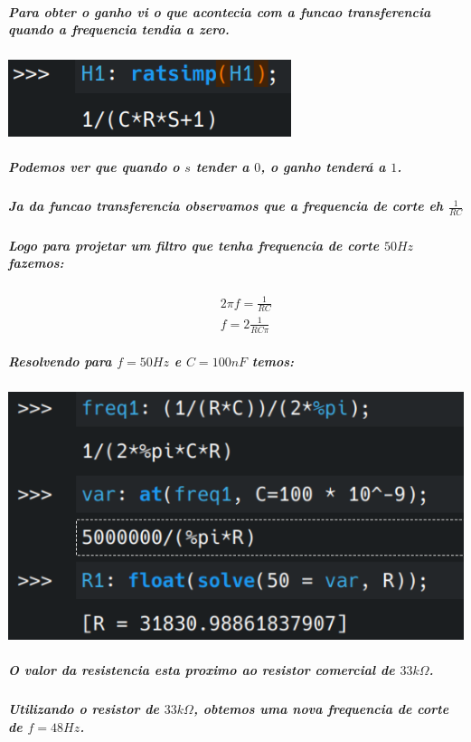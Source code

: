 \documentclass[12pt,twoside, a4paper, twocolumn]{article}
\begin{document}
\subparagraph*{Para obter o ganho vi o que acontecia com a funcao transferencia quando a frequencia tendia a zero.}
\subparagraph*{}
\begin{adjustbox}{scale=0.4}
    \includegraphics{ganho1.png}
\end{adjustbox}
\subparagraph*{Podemos ver que quando o $s$ tender a $0$, o ganho tenderá a $1$.}

\subparagraph*{Ja da funcao transferencia observamos que a frequencia de corte eh $\frac{1}{RC}$}

\subparagraph*{Logo para projetar um filtro que tenha frequencia de corte $50Hz$ fazemos:}

\begin{equation*}
    \begin{aligned}
         &  & 2  \pi f = \frac{1}{RC} \\
         &  & f = 2 \frac{1}{RC \pi}
    \end{aligned}
\end{equation*}

\subparagraph*{Resolvendo para $f = 50Hz$ e $C = 100nF$ temos:}
\subparagraph*{}
\begin{adjustbox}{scale=0.4}
    \includegraphics{freqcorte1.png}
\end{adjustbox}

\subparagraph*{O valor da resistencia esta proximo ao resistor comercial de $33k \varOmega$.}

\subparagraph*{Utilizando o resistor de $33k \varOmega$, obtemos uma nova frequencia de corte de $f = 48Hz$.}
\end{document}

